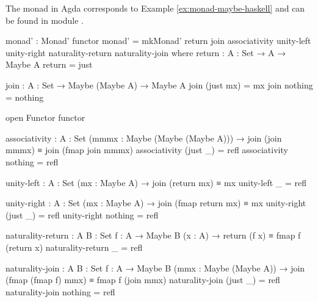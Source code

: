 \begin{example}
  \label{ex:monad-maybe-agda}
  The  monad in Agda corresponds to Example
  \ref{ex:monad-maybe-haskell} and can be found in module
  .
  \begin{codeagda}
monad' : Monad' functor
monad' = mkMonad' return join associativity unity-left unity-right
                  naturality-return naturality-join
  where
    return : {A : Set} → A → Maybe A
    return = just

    join : {A : Set} → Maybe (Maybe A) → Maybe A
    join (just mx) = mx
    join nothing   = nothing

    open Functor functor

    associativity : {A : Set} (mmmx : Maybe (Maybe (Maybe A))) →
                    join (join mmmx) ≡ join (fmap join mmmx)
    associativity (just _) = refl
    associativity nothing  = refl

    unity-left : {A : Set} (mx : Maybe A) → join (return mx) ≡ mx
    unity-left _ = refl

    unity-right : {A : Set} (mx : Maybe A) → join (fmap return mx) ≡ mx
    unity-right (just _) = refl
    unity-right nothing  = refl

    naturality-return : {A B : Set} {f : A → Maybe B} (x : A) →
                        return (f x) ≡ fmap f (return x)
    naturality-return _ = refl

    naturality-join : {A B : Set} {f : A → Maybe B} (mmx : Maybe (Maybe A)) →
                      join (fmap (fmap f) mmx) ≡ fmap f (join mmx)
    naturality-join (just _) = refl
    naturality-join nothing  = refl
  \end{codeagda}
\end{example}

